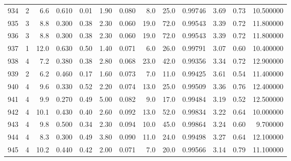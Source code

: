 \begin{tabular}{lrrrrrrrrrrrr}
934  &        2 &            6.6 &             0.610 &         0.01 &            1.90 &      0.080 &                  8.0 &                  25.0 &  0.99746 &  3.69 &       0.73 &  10.500000 \\
935  &        3 &            8.8 &             0.300 &         0.38 &            2.30 &      0.060 &                 19.0 &                  72.0 &  0.99543 &  3.39 &       0.72 &  11.800000 \\
936  &        3 &            8.8 &             0.300 &         0.38 &            2.30 &      0.060 &                 19.0 &                  72.0 &  0.99543 &  3.39 &       0.72 &  11.800000 \\
937  &        1 &           12.0 &             0.630 &         0.50 &            1.40 &      0.071 &                  6.0 &                  26.0 &  0.99791 &  3.07 &       0.60 &  10.400000 \\
938  &        4 &            7.2 &             0.380 &         0.38 &            2.80 &      0.068 &                 23.0 &                  42.0 &  0.99356 &  3.34 &       0.72 &  12.900000 \\
939  &        2 &            6.2 &             0.460 &         0.17 &            1.60 &      0.073 &                  7.0 &                  11.0 &  0.99425 &  3.61 &       0.54 &  11.400000 \\
940  &        4 &            9.6 &             0.330 &         0.52 &            2.20 &      0.074 &                 13.0 &                  25.0 &  0.99509 &  3.36 &       0.76 &  12.400000 \\
941  &        4 &            9.9 &             0.270 &         0.49 &            5.00 &      0.082 &                  9.0 &                  17.0 &  0.99484 &  3.19 &       0.52 &  12.500000 \\
942  &        4 &           10.1 &             0.430 &         0.40 &            2.60 &      0.092 &                 13.0 &                  52.0 &  0.99834 &  3.22 &       0.64 &  10.000000 \\
943  &        4 &            9.8 &             0.500 &         0.34 &            2.30 &      0.094 &                 10.0 &                  45.0 &  0.99864 &  3.24 &       0.60 &   9.700000 \\
944  &        4 &            8.3 &             0.300 &         0.49 &            3.80 &      0.090 &                 11.0 &                  24.0 &  0.99498 &  3.27 &       0.64 &  12.100000 \\
945  &        4 &           10.2 &             0.440 &         0.42 &            2.00 &      0.071 &                  7.0 &                  20.0 &  0.99566 &  3.14 &       0.79 &  11.100000 \\

\end{tabular}
